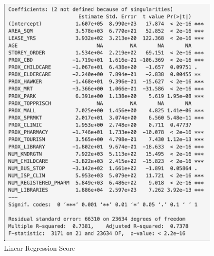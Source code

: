 \documentclass[manuscript,screen]{acmart}
\begin{document}
\begin{figure}

{\centering \includegraphics{images/Screenshot 2023-04-15 at 10.52.59 PM.png}

}

\caption{\label{fig-9}Linear Regression Score}

\end{figure}
\end{document}
